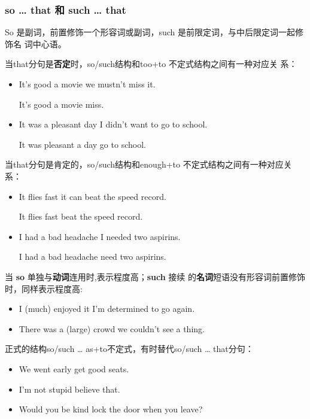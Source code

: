 \subsubsection{so \ldots{} that 和 such \ldots{} that}

So 是副词，前置修饰一个形容词或副词，such 是前限定词，与中后限定词一起修饰名
词中心语。

当that分句是\textbf{否定}时，so/such结构和too+to 不定式结构之间有一种对应关
系：
\begin{itemize}
\item It's  good a movie  we mustn't miss it.

  It's  good a movie  miss.

\item It was  a pleasant day  I didn't want to go to school.

  It was  pleasant a day  go to school.
\end{itemize}

当that分句是肯定的，so/such结构和enough+to 不定式结构之间有一种对应关系：
\begin{itemize}
\item It flies  fast  it can beat the speed record.

  It flies fast  beat the speed record.

\item I had  a bad headache  I needed two aspirins.

  I had a bad  headache  need two aspirins.
\end{itemize}


当 \textbf{so} 单独与\textbf{动词}连用时,表示程度高；\textbf{such} 接续
的\textbf{名词}短语没有形容词前置修饰时，同样表示程度高:
\begin{itemize}
\item I  (much) enjoyed it  I'm determined to go
  again.
\item There was  a (large) crowd  we couldn't see a thing.
\end{itemize}

正式的结构so/such \ldots{} as+to不定式，有时替代so/such \ldots{} that分句：
\begin{itemize}
\item  We went early  get good seats.

\item I'm not  stupid  believe that.

\item Would you be  kind  lock the door when you leave?
\end{itemize}















